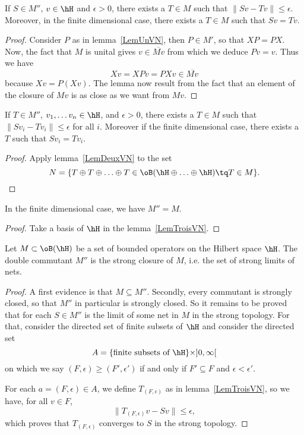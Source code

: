\begin{lemma}		\label{LemDeuxVN}
	If $S\in M''$, $v\in \hH$ and $\epsilon >0$, there exists a $T\in M$ such that $\| Sv-Tv \|\leq\epsilon$. Moreover, in the finite dimensional case, there exists a $T\in M$ such that $Sv=Tv$.
\end{lemma}

\begin{proof}
	Consider $P$ as in lemma~\ref{LemUnVN}, then $P\in M'$, so that $XP=PX$. Now, the fact that $M$ is unital gives $v\in \overline{ Mv }$ from which we deduce $Pv=v$. Thus we have
	\[
		Xv=XPv=PXv\in\overline{ Mv }
	\]
	because $Xv=P(Xv)$. The lemma now result from the fact that an element of the closure of $Mv$ is as close as we want from $Mv$.
\end{proof}

\begin{lemma}		\label{LemTroisVN}
	If $T\in M''$, $v_1, \ldots v_n\in\hH$, and $\epsilon>0$, there exists a $T\in M$ such that $\| Sv_i-Tv_i \|\leq\epsilon$ for all $i$. Moreover if the finite dimensional case, there exists a $T$ such that $Sv_i=Tv_i$.
\end{lemma}

\begin{proof}
	Apply lemma~\ref{LemDeuxVN} to the set
	\[
		N=\{ T\oplus T\oplus\ldots\oplus T\in\oB(\hH\oplus\ldots\oplus\hH)\tq T\in M \}.
	\]
\end{proof}

\begin{corollary}
	In the finite dimensional case, we have $M''=M$.
\end{corollary}

\begin{proof}
	Take a basis of $\hH$ in the lemma~\ref{LemTroisVN}.
\end{proof}

\begin{theorem}		\label{ThoDoubleCommutant}
	Let $M\subset\oB(\hH)$ be a set of bounded operators on the Hilbert space $\hH$. The double commutant $M''$ is the strong closure of $M$, i.e. the set of strong limits of nets.
\end{theorem}

\begin{proof}
	A first evidence is that $M\subseteq M''$. Secondly, every commutant is strongly closed, so that $M''$ in particular is strongly closed. So it remains to be proved that for each $S\in M''$ is the limit of some net in $M$ in the strong topology. For that, consider the directed set of finite subsets of $\hH$ and consider the directed set
	\[
		A=\{ \text{finite subsets of }\hH \}\times ]0,\infty[
	\]
	on which we say $(F,\epsilon)\geq (F',\epsilon')$ if and only if $F'\subseteq F$ and $\epsilon <\epsilon'$.

	For each $a=(F,\epsilon)\in A$, we define $T_{(F,\epsilon)}$ as in lemma~\ref{LemTroisVN}, so we have, for all $v\in F$,
	\[
		\| T_{(F,\epsilon)}v-Sv \|\leq\epsilon,
	\]
	which proves that $T_{(F,\epsilon)}$ converges to $S$ in the strong topology.
\end{proof}

